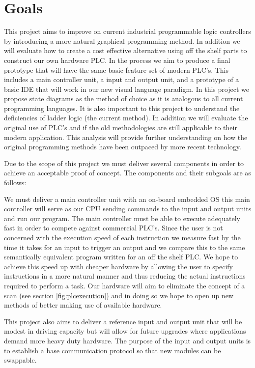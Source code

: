 \section{Goals}

This project aims to improve on current industrial programmable logic controllers by introducing a more natural graphical programming method. In addition we will evaluate how to create a cost effective alternative using off the shelf parts to construct our own hardware PLC. In the process we aim to produce a final prototype that will have the same basic feature set of modern PLC's. This includes a main controller unit, a input and output unit, and a prototype of a basic IDE that will work in our new visual language paradigm. In this project we propose state diagrams as the method of choice as it is analogous to all current programming languages. It is also important to this project to understand the deficiencies of ladder logic (the current method). In addition we will evaluate the original use of PLC's and if the old methodologies are still applicable to their modern application. This analysis will provide further understanding on how the original programming methods have been outpaced by more recent technology.

Due to the scope of this project we must deliver several components in order to achieve an acceptable proof of concept. The components and their subgoals are as follows:

We must deliver a main controller unit with an on-board embedded OS this main controller will serve as our CPU sending commands to the input and output units and run our program. The main controller must be able to execute adequately fast in order to compete against commercial PLC's. Since the user is not concerned with the execution speed of each instruction we measure fast by the time it takes for an input to trigger an output and we compare this to the same semantically equivalent program written for an off the shelf PLC. We hope to achieve this speed up with cheaper hardware by allowing the user to specify instructions in a more natural manner and thus reducing the actual instructions required to perform a task. Our hardware will aim to eliminate the concept of a scan (see section \ref{fig:plcexecution}) and in doing so we hope to open up new methods of better making use of available hardware.

This project also aims to deliver a reference input and output unit that will be modest in driving capacity but will allow for future upgrades where applications demand more heavy duty hardware. The purpose of the input and output units is to establish a base communication protocol so that new modules can be swappable.

